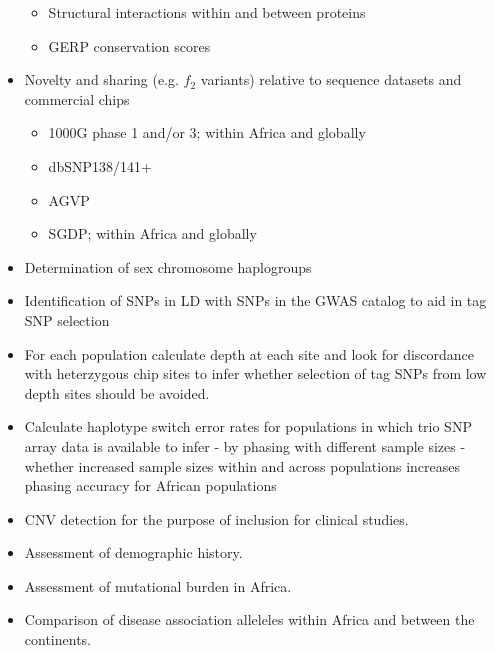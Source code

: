 \begin{itemize}
\begin{itemize}
   \item{Structural interactions within and between proteins
   }
   \item{GERP conservation scores}
  \end{itemize}
 \item Novelty and sharing (e.g. $f_2$ variants) relative to sequence datasets and commercial chips
 \begin{itemize}
  \item 1000G phase 1 and/or 3; within Africa and globally
  \item dbSNP138/141+
  \item AGVP
  \item SGDP; within Africa and globally
 \end{itemize}
 \item{Determination of sex chromosome haplogroups
 }
 \item Identification of SNPs in LD with SNPs in the GWAS catalog to aid in tag SNP selection
 \item For each population calculate depth at each site and look for discordance with heterzygous chip sites to infer whether selection of tag SNPs from low depth sites should be avoided.
 \item {Calculate haplotype switch error rates for populations in which trio SNP array data is available to infer - by phasing with different sample sizes - whether increased sample sizes within and across populations increases phasing accuracy for African populations
 }
  \item CNV detection for the purpose of inclusion for clinical studies.
  \item Assessment of demographic history.
  \item Assessment of mutational burden in Africa.
  \item Comparison of disease association alleleles within Africa and between the continents.
\end{itemize}


